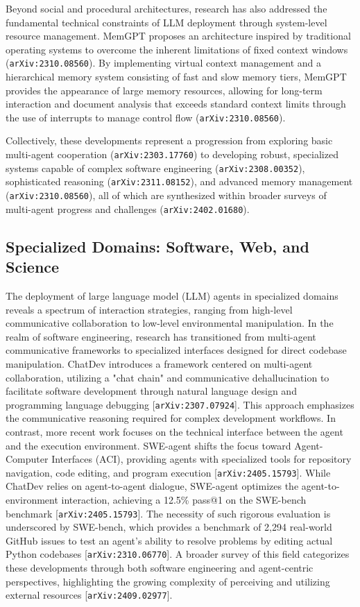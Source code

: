 \documentclass[11pt]{article}
\begin{document}
Beyond social and procedural architectures, research has also addressed the fundamental technical constraints of LLM deployment through system-level resource management. MemGPT proposes an architecture inspired by traditional operating systems to overcome the inherent limitations of fixed context windows (\texttt{arXiv:2310.08560}). By implementing virtual context management and a hierarchical memory system consisting of fast and slow memory tiers, MemGPT provides the appearance of large memory resources, allowing for long-term interaction and document analysis that exceeds standard context limits through the use of interrupts to manage control flow (\texttt{arXiv:2310.08560}).

Collectively, these developments represent a progression from exploring basic multi-agent cooperation (\texttt{arXiv:2303.17760}) to developing robust, specialized systems capable of complex software engineering (\texttt{arXiv:2308.00352}), sophisticated reasoning (\texttt{arXiv:2311.08152}), and advanced memory management (\texttt{arXiv:2310.08560}), all of which are synthesized within broader surveys of multi-agent progress and challenges (\texttt{arXiv:2402.01680}).

\subsection{Specialized Domains: Software, Web, and Science}

The deployment of large language model (LLM) agents in specialized domains reveals a spectrum of interaction strategies, ranging from high-level communicative collaboration to low-level environmental manipulation. In the realm of software engineering, research has transitioned from multi-agent communicative frameworks to specialized interfaces designed for direct codebase manipulation. ChatDev introduces a framework centered on multi-agent collaboration, utilizing a "chat chain" and communicative dehallucination to facilitate software development through natural language design and programming language debugging [\texttt{arXiv:2307.07924}]. This approach emphasizes the communicative reasoning required for complex development workflows. In contrast, more recent work focuses on the technical interface between the agent and the execution environment. SWE-agent shifts the focus toward Agent-Computer Interfaces (ACI), providing agents with specialized tools for repository navigation, code editing, and program execution [\texttt{arXiv:2405.15793}]. While ChatDev relies on agent-to-agent dialogue, SWE-agent optimizes the agent-to-environment interaction, achieving a 12.5\% pass@1 on the SWE-bench benchmark [\texttt{arXiv:2405.15793}]. The necessity of such rigorous evaluation is underscored by SWE-bench, which provides a benchmark of 2,294 real-world GitHub issues to test an agent's ability to resolve problems by editing actual Python codebases [\texttt{arXiv:2310.06770}]. A broader survey of this field categorizes these developments through both software engineering and agent-centric perspectives, highlighting the growing complexity of perceiving and utilizing external resources [\texttt{arXiv:2409.02977}].
\end{document}
